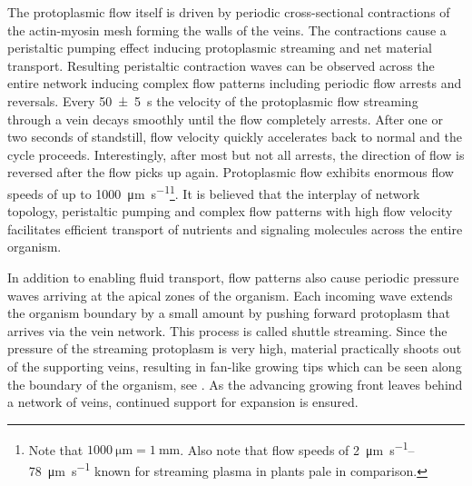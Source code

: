 		The protoplasmic flow itself is driven by periodic cross-sectional contractions of the actin-myosin mesh forming the walls of the veins. The contractions cause a peristaltic pumping effect inducing protoplasmic streaming and net material transport. Resulting peristaltic contraction waves can be observed across the entire network inducing complex flow patterns including periodic flow arrests and reversals. Every \SI{50 \pm 5}{\second} the velocity of the protoplasmic flow streaming through a vein decays smoothly until the flow completely arrests. After one or two seconds of standstill, flow velocity quickly accelerates back to normal and the cycle proceeds. Interestingly, after most but not all arrests, the direction of flow is reversed after the flow picks up again. Protoplasmic flow exhibits enormous flow speeds of up to \SI[per-mode=symbol]{1000}{\micro\metre\per\second}\footnote{Note that $\SI{1000}{\micro\metre} = \SI{1}{\milli\metre}$. Also note that flow speeds of \SIrange[per-mode=symbol]{2}{78}{\micro\metre\per\second} known for streaming plasma in plants pale in comparison.}. It is believed that the interplay of network topology, peristaltic pumping and complex flow patterns with high flow velocity facilitates efficient transport of nutrients and signaling molecules across the entire organism. 

		In addition to enabling fluid transport, flow patterns also cause periodic pressure waves arriving at the apical zones of the organism. Each incoming wave extends the organism boundary by a small amount by pushing forward protoplasm that arrives via the vein network. This process is called shuttle streaming. Since the pressure of the streaming protoplasm is very high, material practically shoots out of the supporting veins, resulting in fan-like growing tips which can be seen along the boundary of the organism, see . As the advancing growing front leaves behind a network of veins, continued support for expansion is ensured.

